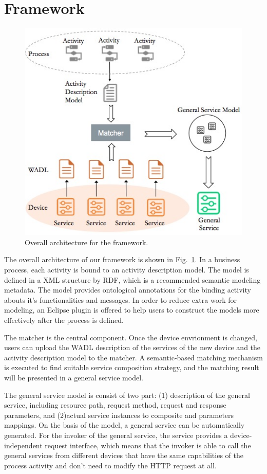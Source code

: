 \section{Framework}
\label{Framework}
\begin{figure}[!b]
\centering
\includegraphics[width=1.0\linewidth]{./graph/framework}
\caption{Overall architecture for the framework.}
\label{fig_framework}
\end{figure}
The overall architecture of our framework is shown in Fig.~\ref{fig_framework}. In a business process, each activity is bound to an activity description model. The model is defined in a XML structure by RDF, which is a recommended semantic modeling metadata. The model provides ontological annotations for the binding activity abouts it's functionalities and messages. In order to reduce extra work for modeling, an Eclipse plugin is offered to help users to construct the models more effectively after the process is  defined. 

The matcher is the central component. Once the device envrionment is changed, users can upload the WADL description of the services of the new device and the activity description model to the matcher. A semantic-based matching mechanism is executed to find suitable service composition strategy, and the matching result will be presented in a general service model. 

The general service model is consist of two part: (1) description of the general service, including resource path, request method, request and response parameters, and (2)actual service instances to composite and parameters mappings. On the basis of the model, a general service can be automatically generated. For the invoker of the general service, the service provides a device-independent request interface, which means that the invoker is able to call the general services from different devices that have the same capabilities of the process activity and don't need to modify the HTTP request at all. 